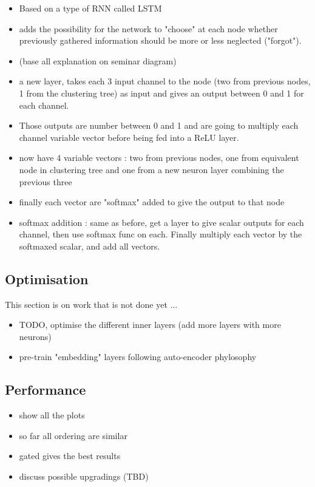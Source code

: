 \begin{itemize}
    \item Based on a type of RNN called LSTM
    \item adds the possibility for the network to "choose" at each node whether previously gathered information should be more or less neglected ("forgot").
    \item (base all explanation on seminar diagram)
    \item a new layer, takes each 3 input channel to the node (two from previous nodes, 1 from the clustering tree) as input and gives an output between 0 and 1 for each channel.
    \item Those outputs are number between 0 and 1 and are going to multiply each channel variable vector before being fed into a ReLU layer.
    \item now have 4 variable vectors : two from previous nodes, one from equivalent node in clustering tree and one from a new neuron layer combining the previous three
    \item finally each vector are "softmax" added to give the output to that node
    \item softmax addition : same as before, get a layer to give scalar outputs for each channel, then use softmax func on each. Finally multiply each vector by the softmaxed scalar, and add all vectors.
\end{itemize}



\subsection{Optimisation}

This section is on work that is not done yet ...

\begin{itemize}
    \item TODO, optimise the different inner layers (add more layers with more neurons)
    \item pre-train "embedding" layers following auto-encoder phylosophy
\end{itemize}

\subsection{Performance}

\begin{itemize}
    \item show all the plots
    \item so far all ordering are similar
    \item gated gives the best results
    \item discuss possible upgradings (TBD)
\end{itemize}
